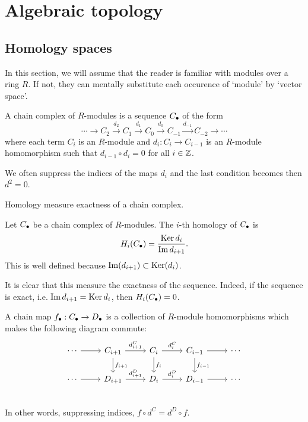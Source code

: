 \section*{Algebraic topology}
\subsection*{Homology spaces}
In this section, we will assume that the reader is familiar with modules over a ring $R$. If not, they can mentally substitute each occurence of `module' by `vector space'.

\begin{definition}
    A chain complex of $R$-modules is a sequence $C_\bullet$ of the form
    \[
    \cdots \to  C_2 \xrightarrow{d_2}  C_1 \xrightarrow{d_1} C_0 \xrightarrow{d_0} C_{-1} \xrightarrow{d_{-1}}   C_{-2} \to  \cdots
    \] 
    where each term $C_i$ is an $R$-module and $d_i: C_i \to  C_{i-1}$ is an $R$-module homomorphism such that $d_{i-1}  \circ  d_i = 0$  for all $i \in \mathbb{Z}$.
\end{definition}
We often suppress the indices of the maps $d_i$ and the last condition becomes then  $d^2 = 0$.

\begin{marginfigure}
    \centering
    \caption{Homology measure exactness of a chain complex.}
    \label{fig:homology-definition}
\end{marginfigure}

\begin{definition}[Homology]
    Let $C_\bullet$ be a chain complex of  $R$-modules. The $i$-th homology of $C_\bullet$ is
     \[
         H_i(C_\bullet) = \frac{\operatorname{Ker} d_i}{\operatorname{Im} d_{i+1}}
    .\] 
    This is well defined because $\operatorname{Im}(d_{i+1}) \subset \operatorname{Ker} (d_i)$.
\end{definition}
It is clear that this measure the exactness of the sequence. Indeed, if the sequence is exact, i.e. $\operatorname{Im} d_{i+1} = \operatorname{Ker} d_i$, then $H_i(C_\bullet) = 0$.


\begin{definition}
    A chain map $f_\bullet: C_\bullet \to  D_\bullet$ is a collection of $R$-module homomorphisms which makes the following diagram commute:
    \[
        \begin{tikzcd}
            \cdots  \arrow[r, ""]&
            C_{i+1} \arrow[r, "d_{i+1}^{C}"] \arrow[d, "f_{i+1}"]&
            C_{i} \arrow[r, "d_{i}^{C}"] \arrow[d, "f_i"]&
            C_{i-1} \arrow[r, ""] \arrow[d, "f_{i-1}"]&
            \cdots \\
            \cdots  \arrow[r, ""]&
            D_{i+1} \arrow[r, "d_{i+1}^{D}"] &
            D_{i} \arrow[r, "d_{i}^{D}"] &
            D_{i-1} \arrow[r, ""] &
            \cdots \\
        \end{tikzcd}
    \]
    In other words, suppressing indices, $f  \circ  d^{C} = d^{D}  \circ f$.
\end{definition}

